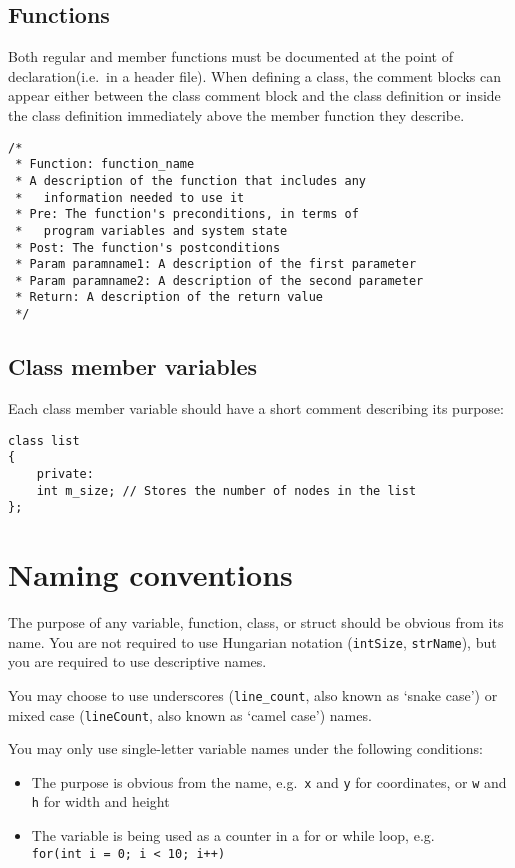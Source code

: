 \documentclass{article}
\newcommand{\code}[1]{\texttt{\colorbox{gray!30}{#1}}}
\begin{document}
\subsection{Functions}
Both regular and member functions must be documented at the point of declaration(i.e.\ in a header file).
When defining a class, the comment blocks can appear either between the class comment block and the class definition or inside the class definition immediately above the member function they describe.

\begin{lstlisting}
/*
 * Function: function_name
 * A description of the function that includes any
 *   information needed to use it
 * Pre: The function's preconditions, in terms of
 *   program variables and system state
 * Post: The function's postconditions
 * Param paramname1: A description of the first parameter
 * Param paramname2: A description of the second parameter
 * Return: A description of the return value
 */
\end{lstlisting}

\subsection{Class member variables}
Each class member variable should have a short comment describing its purpose:
\begin{lstlisting}
class list
{
	private:
	int m_size; // Stores the number of nodes in the list
};
\end{lstlisting}

\section{Naming conventions}
The purpose of any variable, function, class, or struct should be obvious from its name.
You are not required to use Hungarian notation (\code{intSize}, \code{strName}), but you are required to use descriptive names.

You may choose to use underscores (\code{line\_count}, also known as `snake case') or mixed case (\code{lineCount}, also known as `camel case') names.

You may only use single-letter variable names under the following conditions:
\begin{itemize}
	\item The purpose is obvious from the name, e.g.\ \code{x} and \code{y} for coordinates, or \code{w} and \code{h} for width and height
	\item The variable is being used as a counter in a for or while loop, e.g.\\ \code{for(int i = 0; i < 10; i++)}
\end{itemize}
\end{document}
